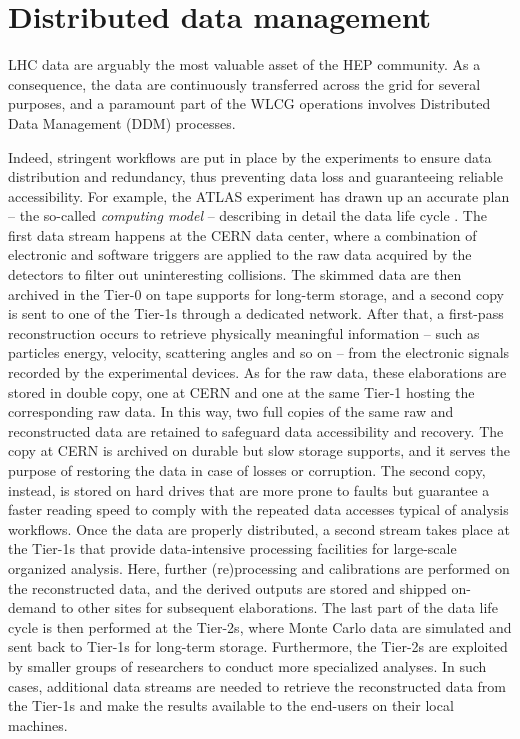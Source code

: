 \section{Distributed data management}
\label{ddm}

LHC data are arguably the most valuable asset of the HEP community.
As a consequence, the data are continuously transferred across the grid for several purposes, and a paramount part of the WLCG operations involves Distributed Data Management (DDM) processes.

Indeed, stringent workflows are put in place by the experiments to ensure data distribution and redundancy, thus preventing data loss and guaranteeing reliable accessibility.
For example, the ATLAS experiment has drawn up an accurate plan -- the so-called \textit{computing model} -- describing in detail the data life cycle \cite{aad2008atlas, calafiura2020design_report, bird2011computing}.
The first data stream happens at the CERN data center, where a combination of electronic and software triggers are applied to the raw data acquired by the detectors to filter out uninteresting collisions.
The skimmed data are then archived in the Tier-0 on tape supports for long-term storage, and a second copy is sent to one of the Tier-1s through a dedicated network. 
After that, a first-pass reconstruction occurs to retrieve physically meaningful information -- such as particles energy, velocity, scattering angles and so on -- from the electronic signals recorded by the experimental devices.
As for the raw data, these elaborations are stored in double copy, one at CERN and one at the same Tier-1 hosting the corresponding raw data.
In this way, two full copies of the same raw and reconstructed data are retained to safeguard data accessibility and recovery.
The copy at CERN is archived on durable but slow storage supports, and it serves the purpose of restoring the data in case of losses or corruption. The second copy, instead, is stored on hard drives that are more prone to faults but guarantee a faster reading speed to comply with the repeated data accesses typical of analysis workflows.
Once the data are properly distributed, a second stream takes place at the Tier-1s that provide data-intensive processing facilities for large-scale organized analysis. Here, further (re)processing and calibrations are performed on the reconstructed data, and the derived outputs are stored and shipped on-demand to other sites for subsequent elaborations.
The last part of the data life cycle is then performed at the Tier-2s, where Monte Carlo data are simulated and sent back to Tier-1s for long-term storage. 
Furthermore, the Tier-2s are exploited by smaller groups of researchers to conduct more specialized analyses. In such cases, additional data streams are needed to retrieve the reconstructed data from the Tier-1s and make the results available to the end-users on their local machines.

